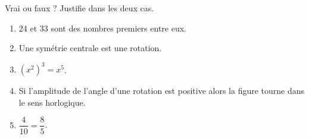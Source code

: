 %
%
    Vrai ou faux ? Justifie dans les deux cas.
    \begin{enumerate}
        \item 24 et 33 sont des nombres premiers entre eux.
        \par\blank[width=2\linewidth,linespread=1.5]{}
        \item Une symétrie centrale est une rotation.
        \par\blank[width=2\linewidth,linespread=1.5]{}
        \item $\left(x^2\right)^3 = x^5$.
        \par\blank[width=2\linewidth,linespread=1.5]{}
        \item Si l'amplitude de l'angle d'une rotation est positive alors la figure tourne dans le sens horlogique.
        \par\blank[width=2\linewidth,linespread=1.5]{}
        \item $\dfrac{4}{10}=\dfrac{8}{5}$.
        \par\blank[width=2\linewidth,linespread=1.5]{}
    \end{enumerate}
